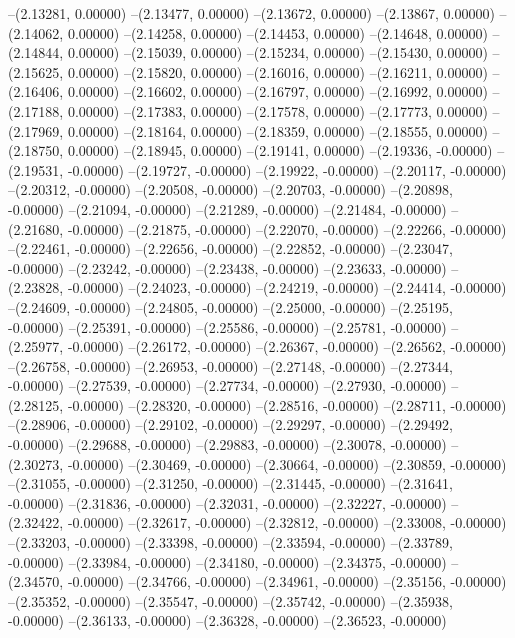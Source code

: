 --(2.13281, 0.00000)
--(2.13477, 0.00000)
--(2.13672, 0.00000)
--(2.13867, 0.00000)
--(2.14062, 0.00000)
--(2.14258, 0.00000)
--(2.14453, 0.00000)
--(2.14648, 0.00000)
--(2.14844, 0.00000)
--(2.15039, 0.00000)
--(2.15234, 0.00000)
--(2.15430, 0.00000)
--(2.15625, 0.00000)
--(2.15820, 0.00000)
--(2.16016, 0.00000)
--(2.16211, 0.00000)
--(2.16406, 0.00000)
--(2.16602, 0.00000)
--(2.16797, 0.00000)
--(2.16992, 0.00000)
--(2.17188, 0.00000)
--(2.17383, 0.00000)
--(2.17578, 0.00000)
--(2.17773, 0.00000)
--(2.17969, 0.00000)
--(2.18164, 0.00000)
--(2.18359, 0.00000)
--(2.18555, 0.00000)
--(2.18750, 0.00000)
--(2.18945, 0.00000)
--(2.19141, 0.00000)
--(2.19336, -0.00000)
--(2.19531, -0.00000)
--(2.19727, -0.00000)
--(2.19922, -0.00000)
--(2.20117, -0.00000)
--(2.20312, -0.00000)
--(2.20508, -0.00000)
--(2.20703, -0.00000)
--(2.20898, -0.00000)
--(2.21094, -0.00000)
--(2.21289, -0.00000)
--(2.21484, -0.00000)
--(2.21680, -0.00000)
--(2.21875, -0.00000)
--(2.22070, -0.00000)
--(2.22266, -0.00000)
--(2.22461, -0.00000)
--(2.22656, -0.00000)
--(2.22852, -0.00000)
--(2.23047, -0.00000)
--(2.23242, -0.00000)
--(2.23438, -0.00000)
--(2.23633, -0.00000)
--(2.23828, -0.00000)
--(2.24023, -0.00000)
--(2.24219, -0.00000)
--(2.24414, -0.00000)
--(2.24609, -0.00000)
--(2.24805, -0.00000)
--(2.25000, -0.00000)
--(2.25195, -0.00000)
--(2.25391, -0.00000)
--(2.25586, -0.00000)
--(2.25781, -0.00000)
--(2.25977, -0.00000)
--(2.26172, -0.00000)
--(2.26367, -0.00000)
--(2.26562, -0.00000)
--(2.26758, -0.00000)
--(2.26953, -0.00000)
--(2.27148, -0.00000)
--(2.27344, -0.00000)
--(2.27539, -0.00000)
--(2.27734, -0.00000)
--(2.27930, -0.00000)
--(2.28125, -0.00000)
--(2.28320, -0.00000)
--(2.28516, -0.00000)
--(2.28711, -0.00000)
--(2.28906, -0.00000)
--(2.29102, -0.00000)
--(2.29297, -0.00000)
--(2.29492, -0.00000)
--(2.29688, -0.00000)
--(2.29883, -0.00000)
--(2.30078, -0.00000)
--(2.30273, -0.00000)
--(2.30469, -0.00000)
--(2.30664, -0.00000)
--(2.30859, -0.00000)
--(2.31055, -0.00000)
--(2.31250, -0.00000)
--(2.31445, -0.00000)
--(2.31641, -0.00000)
--(2.31836, -0.00000)
--(2.32031, -0.00000)
--(2.32227, -0.00000)
--(2.32422, -0.00000)
--(2.32617, -0.00000)
--(2.32812, -0.00000)
--(2.33008, -0.00000)
--(2.33203, -0.00000)
--(2.33398, -0.00000)
--(2.33594, -0.00000)
--(2.33789, -0.00000)
--(2.33984, -0.00000)
--(2.34180, -0.00000)
--(2.34375, -0.00000)
--(2.34570, -0.00000)
--(2.34766, -0.00000)
--(2.34961, -0.00000)
--(2.35156, -0.00000)
--(2.35352, -0.00000)
--(2.35547, -0.00000)
--(2.35742, -0.00000)
--(2.35938, -0.00000)
--(2.36133, -0.00000)
--(2.36328, -0.00000)
--(2.36523, -0.00000)
